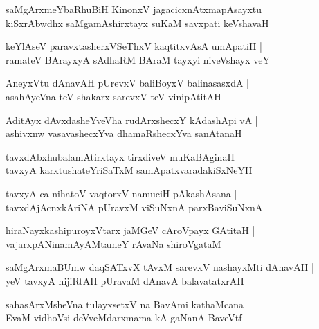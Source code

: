 \begin{shloka}
saMgArxmeYbaRhuBiH KinonxV jagacicxnAtxmapAsayxtu |\\
kiSxrAbwdhx saMgamAshirxtayx suKaM savxpati keVshavaH
\end{shloka}

\begin{shloka}
keYlAseV paravxtasherxVSeThxV kaqtitxvAsA umApatiH |\\
ramateV BArayxyA sAdhaRM BAraM tayxyi niveVshayx veY 
\end{shloka}

\begin{shloka}
AneyxVtu dAnavAH pUrevxV baliBoyxV balinasasxdA |\\
asahAyeVna teV shakarx sarevxV teV vinipAtitAH
\end{shloka}

\begin{shloka}
AditAyx dAvxdasheYveVha rudArxshecxY kAdashApi vA |\\
ashivxnw vasavashecxYva dhamaRshecxYva sanAtanaH 
\end{shloka}

\begin{shloka}
tavxdAbxhubalamAtirxtayx tirxdiveV muKaBAginaH |\\
tavxyA karxtushateYriSaTxM samApatxvaradakiSxNeYH
\end{shloka}

\begin{shloka}
tavxyA ca nihatoV vaqtorxV namuciH pAkashAsana |\\
tavxdAjAcnxkAriNA pUravxM viSuNxnA parxBaviSuNxnA
\end{shloka}

\begin{shloka}
hiraNayxkashipuroyxVtarx jaMGeV cAroVpayx GAtitaH |\\
vajarxpANinamAyAMtameY rAvaNa shiroVgataM
\end{shloka}

\begin{shloka}
saMgArxmaBUmw daqSATxvX tAvxM sarevxV nashayxMti dAnavAH |\\
yeV tavxyA nijiRtAH pUravaM dAnavA balavatatxrAH
\end{shloka}

\begin{shloka}
sahasArxMsheVna tulayxsetxV na BavAmi kathaMcana |\\
EvaM vidhoVsi deVveMdarxmama kA gaNanA BaveVtf
\end{shloka}

